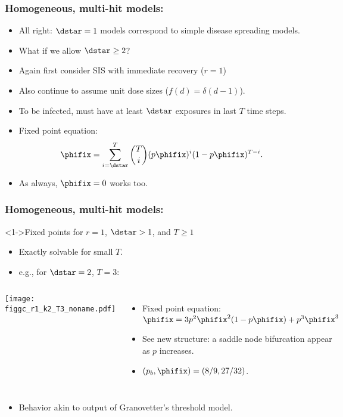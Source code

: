 \begin{frame}
  \frametitle{Homogeneous, multi-hit models:}

  \begin{itemize}
  \item<1-> 
    All right: $\dstar=1$ models correspond
    to simple disease spreading models.
  \item<2-> 
    What if we allow $\dstar \ge 2$?
  \item<3->
    Again first consider SIS with immediate recovery ($r=1$)
  \item<4->
    Also continue to assume unit dose sizes ($f(d) = \delta(d-1)$).
  \item<5->
    To be infected, must have at least $\dstar$
    exposures in last $T$ time steps.
  \item<6->
    Fixed point equation:
    $$
    \phifix = 
    \sum_{i=\dstar}^{T}
    \binom{T}{i}
    (p\phifix)^{i} (1 - p\phifix)^{T-i}.
    $$
  \item<7->
    As always, $\phifix=0$ works too.
 \end{itemize}

\end{frame}

\begin{frame}
  \frametitle{Homogeneous, multi-hit models:}

  \begin{block}<1->{Fixed points for $r = 1$, $\dstar > 1$, and $T \ge 1$}
    \begin{itemize}
    \item<2-> 
      Exactly solvable for small $T$.
    \item<3-> 
      e.g., for $\dstar=2$, $T=3$:
    \end{itemize}
  \end{block}

  \begin{columns}
    \begin{overprint}
      \texttt{[image: figgc\_r1\_k2\_T3\_noname.pdf]} 
    \end{overprint}
    \begin{itemize}
    \item<4->
      Fixed point equation:
      $\phifix = 3 p^2 \phifix^2 (1 - p \phifix) + p^3 \phifix^3$
    \item<5->
      See new structure: a \alert{saddle node bifurcation}\cite{strogatz1994a} 
      appear as $p$ increases.
    \item<6->
      $(p_b,\phifix)=(8/9,27/32)$.
    \end{itemize}
  \end{columns}

  \begin{itemize}
  \item<7->
    Behavior akin to output of Granovetter's threshold model.
  \end{itemize}

\end{frame}

